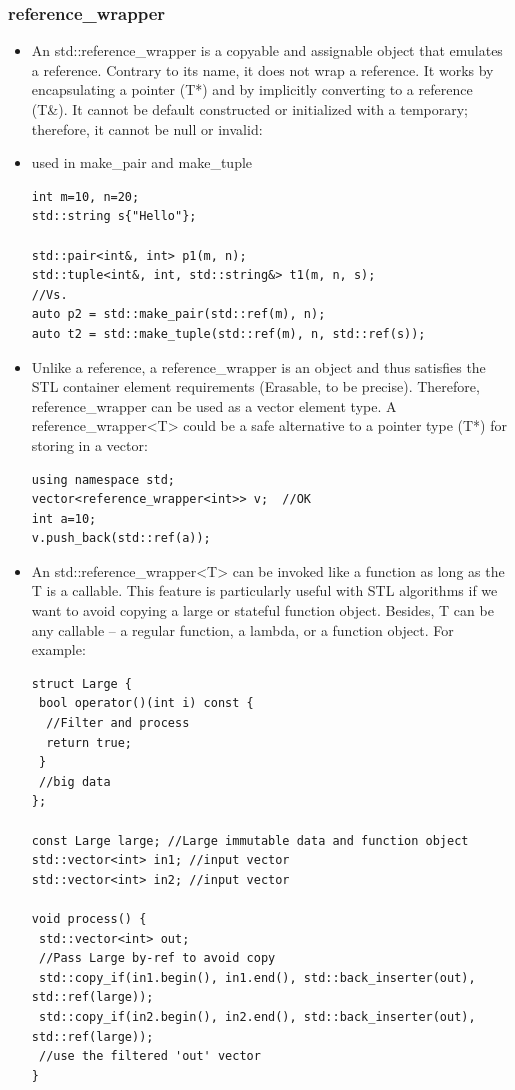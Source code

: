 \documentclass[a4paper,11pt,twoside]{book}
\begin{document}
\subsubsection{reference\_wrapper}
\begin{itemize}
    \item An std::reference\_wrapper is a copyable and assignable object that emulates a reference. Contrary to its name, it does not wrap a reference. It works by encapsulating a pointer (T*) and by implicitly converting to a reference (T\&). It cannot be default constructed or initialized with a temporary; therefore, it cannot be null or invalid:
    \item used in make\_pair and make\_tuple
\begin{lstlisting}
int m=10, n=20;
std::string s{"Hello"};

std::pair<int&, int> p1(m, n);
std::tuple<int&, int, std::string&> t1(m, n, s);
//Vs.
auto p2 = std::make_pair(std::ref(m), n);
auto t2 = std::make_tuple(std::ref(m), n, std::ref(s));
\end{lstlisting}

    \item Unlike a reference, a reference\_wrapper is an object and thus satisfies the STL container element requirements (Erasable, to be precise). Therefore, reference\_wrapper can be used as a vector element type.  A reference\_wrapper<T> could be a safe alternative to a pointer type (T*) for storing in a vector:
\begin{lstlisting}
using namespace std;
vector<reference_wrapper<int>> v;  //OK
int a=10;
v.push_back(std::ref(a));
\end{lstlisting}
    \item An std::reference\_wrapper<T> can be invoked like a function as long as the T is a callable. This feature is particularly useful with STL algorithms if we want to avoid copying a large or stateful function object.  Besides, T can be any callable – a regular function, a lambda, or a function object. For example:
\begin{lstlisting}
struct Large {
 bool operator()(int i) const {
  //Filter and process
  return true;
 }
 //big data
};

const Large large; //Large immutable data and function object
std::vector<int> in1; //input vector
std::vector<int> in2; //input vector

void process() {
 std::vector<int> out;
 //Pass Large by-ref to avoid copy 
 std::copy_if(in1.begin(), in1.end(), std::back_inserter(out), std::ref(large));  
 std::copy_if(in2.begin(), in2.end(), std::back_inserter(out), std::ref(large)); 
 //use the filtered 'out' vector
}
\end{lstlisting}
\end{itemize}
\end{document}
